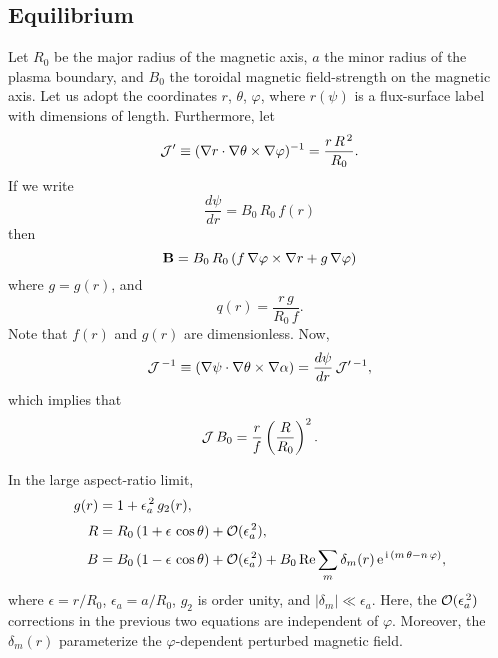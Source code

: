 \documentclass[12pt,prb,aps,notitlepage]{revtex4-1}
\begin{document}
\subsection{Equilibrium}
Let $R_0$ be the major radius of the magnetic axis, $a$ the minor radius of the plasma boundary, and  $B_0$ the toroidal magnetic field-strength on the magnetic axis. Let us adopt the 
coordinates $r$, $\theta$, $\varphi$, where $r(\psi)$ is a flux-surface label with dimensions of length. 
Furthermore, let
\begin{equation}
{\cal J}' \equiv (\nabla r\cdot\nabla\theta\times \nabla\varphi)^{-1}= \frac{r\,R^{\,2}}{R_0}.
\end{equation}
If we write
\begin{equation}\label{psidef}
\frac{d\psi}{dr}= B_0\,R_0\,f(r)
\end{equation}
then
\begin{equation}
{\bf B} = B_0\,R_0\,(f\,\nabla\varphi \times \nabla r + g\,\nabla\varphi)
\end{equation}
where $g=g(r)$, and 
\begin{equation}\label{qdef}
q(r) = \frac{r\,g}{R_0\,f}.
\end{equation}
Note that $f(r)$ and $g(r)$ are dimensionless. 
Now, 
\begin{equation}
{\cal J}^{\,-1} \equiv (\nabla\psi\cdot\nabla\theta\times \nabla\alpha) = \frac{d\psi}{dr}\,{\cal J}'^{\,-1},
\end{equation}
which implies that
\begin{equation}\label{jdef}
{\cal J}\,B_0 = \frac{r}{f}\left(\frac{R}{R_0}\right)^2.
\end{equation}

In the large aspect-ratio limit, 
\begin{align}
g(r)&=1+\epsilon_a^{\,2}\,g_2(r),\label{e151} \\[0.5ex]
R &= R_0\,(1+\epsilon\,\cos\theta) + {\cal O}(\epsilon_a^{\,2}),\label{rdef}\\[0.5ex]
B&= B_0\,(1-\epsilon\,\cos\theta)+{\cal O}(\epsilon_a^{\,2})+ B_0\,{\rm Re}\sum_{m} \delta_{m}(r)\,{\rm e}^{\,{\rm i}\,(m\,\theta-n\,\varphi)},\label{bdef1}
\end{align}
where $\epsilon=r/R_0$, $\epsilon_a=a/R_0$, $g_2$ is order unity, and $|\delta_{m}|\ll \epsilon_a$. Here, the ${\cal O}(\epsilon_a^{\,2})$ corrections in the previous two
equations are independent of $\varphi$. 
Moreover, the $\delta_{m}(r)$ parameterize the $\varphi$-dependent perturbed magnetic field. 
\end{document}
